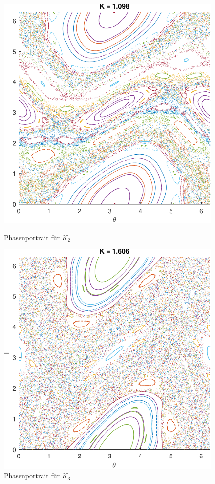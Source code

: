 \documentclass[paper=a4, 
                DIV=12]{scrartcl}
\begin{document}
\begin{figure}[H]
\begin{minipage}[t]{0.48\textwidth}
        \includegraphics[height=0.33\textheight]{phasenportrait_k2.pdf}
        \caption{Phasenportrait für $K_2$}
    \end{minipage}
    \par\vspace{1.3cm}
    \begin{minipage}[t]{0.48\textwidth}
        \centering
        \includegraphics[height=0.33\textheight]{phasenportrait_k3.pdf}
        \caption{Phasenportrait für $K_3$}
    \end{minipage}
\end{figure}
\end{document}
